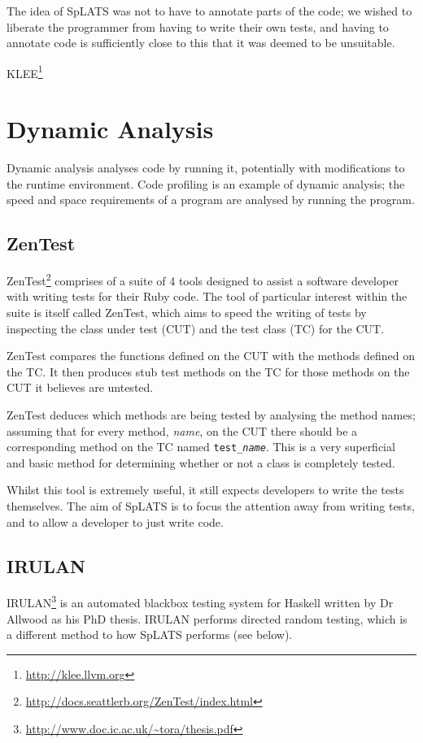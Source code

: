   The idea of SpLATS was not to have to annotate parts of the code; we
  wished to liberate the programmer from having to write their own tests,
  and having to annotate code is sufficiently close to this that it was
  deemed to be unsuitable.

    KLEE\footnote{\url{http://klee.llvm.org}}

\section{Dynamic Analysis} 

  Dynamic analysis analyses code by running it, potentially with modifications
  to the runtime environment. Code profiling is an example of dynamic analysis;
  the speed and space requirements of a program are analysed by running the
  program.

  \subsection{ZenTest}
    ZenTest\footnote{\url{http://docs.seattlerb.org/ZenTest/index.html}}
comprises of a suite of 4 tools designed to assist a software developer with
writing tests for their Ruby code. The tool of particular interest within the suite is itself called ZenTest,
which aims to speed the writing of tests by inspecting the class under test (CUT)
and the test class (TC) for the CUT.

    ZenTest compares the functions defined on the CUT with the methods defined
on the TC. It then produces stub test methods on the TC for those methods on the
CUT it believes are untested.

ZenTest deduces which methods are being tested by analysing the method names; assuming that for every method, \emph{name}, on the CUT there should be a corresponding method on the TC named \texttt{test\_\emph{name}}. This is a very superficial and basic method for determining whether or not a class is completely tested.

    Whilst this tool is extremely useful, it still expects developers to write
the tests themselves. The aim of SpLATS is to focus the attention away from
writing tests, and to allow a developer to just write code.

  \subsection{IRULAN}
    IRULAN\footnote{\url{http://www.doc.ic.ac.uk/~tora/thesis.pdf}} is an automated blackbox testing system for Haskell written by Dr Allwood as his PhD thesis.
    IRULAN performs directed random testing, which is a different method to how SpLATS performs (see below).

